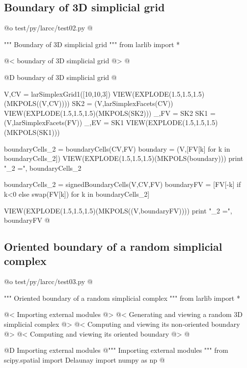 \documentclass[11pt,oneside]{article}    %
\begin{document}
\subsection{Boundary of 3D simplicial grid}

@o test/py/larcc/test02.py
@{""" Boundary of 3D simplicial grid """
from larlib import *

@< boundary of 3D simplicial grid @>
@}

@D boundary of 3D simplicial grid
@{
V,CV = larSimplexGrid1([10,10,3])
VIEW(EXPLODE(1.5,1.5,1.5)(MKPOLS((V,CV))))
SK2 = (V,larSimplexFacets(CV))
VIEW(EXPLODE(1.5,1.5,1.5)(MKPOLS(SK2)))
_,FV = SK2
SK1 = (V,larSimplexFacets(FV))
_,EV = SK1
VIEW(EXPLODE(1.5,1.5,1.5)(MKPOLS(SK1)))

boundaryCells_2 = boundaryCells(CV,FV)
boundary = (V,[FV[k] for k in boundaryCells_2])
VIEW(EXPLODE(1.5,1.5,1.5)(MKPOLS(boundary)))
print "\nboundaryCells_2 =\n", boundaryCells_2

boundaryCells_2 = signedBoundaryCells(V,CV,FV)
boundaryFV = [FV[-k] if k<0 else swap(FV[k]) for k in boundaryCells_2]

VIEW(EXPLODE(1.5,1.5,1.5)(MKPOLS((V,boundaryFV))))
print "\nboundaryCells_2 =\n", boundaryFV
@}


\subsection{Oriented boundary of a random simplicial complex}


@o test/py/larcc/test03.py
@{""" Oriented boundary of a random simplicial complex """
from larlib import *

@< Importing external modules @>
@< Generating and viewing a random 3D simplicial complex @>
@< Computing and viewing its non-oriented boundary @>
@< Computing and viewing its oriented boundary @>
@}


@D Importing external modules
@{""" Importing external modules """
from scipy.spatial import Delaunay
import numpy as np
@}
\end{document}
